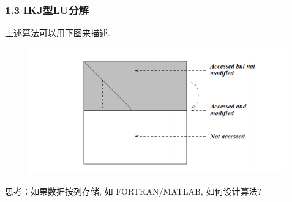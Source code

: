 \documentclass[notheorems,serif]{beamer}
\begin{document}
\begin{frame}
\frametitle{1.3 \quad IKJ型LU分解}
上述算法可以用下图来描述.

\begin{figure}[h]%
	\centering  %
	\includegraphics[width=0.7\linewidth]{figures/Figure_6.png}  %
	\caption{}  %
	\label{fig:mcmthesis-logo}   %
\end{figure}

思考：如果数据按列存储, 如 FORTRAN/MATLAB, 如何设计算法? 
\end{frame}
\end{document}

